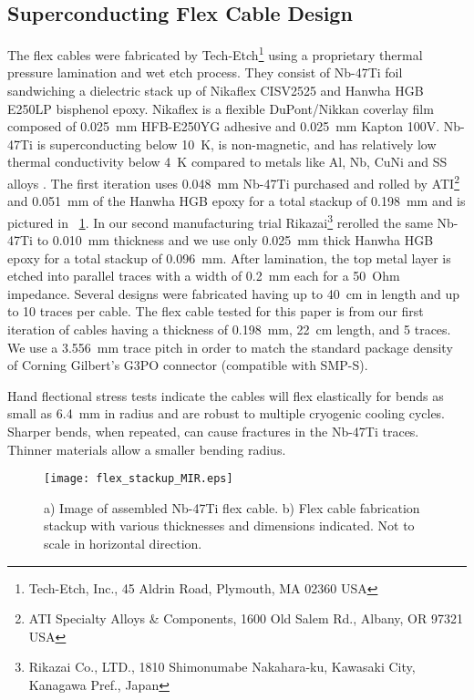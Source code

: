 \subsection{Superconducting Flex Cable Design}
\label{sec:flexcable}
The flex cables were fabricated by Tech-Etch\footnote{Tech-Etch, Inc., 45 Aldrin Road, Plymouth, MA 02360 USA} using a proprietary thermal pressure lamination and wet etch process. They consist of Nb-47Ti foil sandwiching a dielectric stack up of Nikaflex CISV2525 and Hanwha HGB E250LP bisphenol epoxy. Nikaflex is a flexible DuPont/Nikkan coverlay film composed of 0.025~mm HFB-E250YG adhesive and 0.025~mm Kapton 100V. Nb-47Ti is superconducting below 10~K, is non-magnetic, and has relatively low thermal conductivity below 4~K compared to metals like Al, Nb, CuNi and SS alloys \parencite{DaalInPrep}. The first iteration uses 0.048~mm Nb-47Ti purchased and rolled by ATI\footnote{ATI Specialty Alloys \& Components, 1600 Old Salem Rd., Albany, OR 97321 USA} and 0.051~mm of the Hanwha HGB epoxy for a total stackup of 0.198~mm and is pictured in \figurename~\ref{fig:FlexCable}. In our second manufacturing trial Rikazai\footnote{Rikazai Co., LTD., 1810 Shimonumabe Nakahara-ku, Kawasaki City, Kanagawa Pref., Japan} rerolled the same Nb-47Ti to 0.010~mm thickness and we use only 0.025~mm thick Hanwha HGB epoxy for a total stackup of 0.096~mm. After lamination, the top metal layer is etched into parallel traces with a width of 0.2~mm each for a 50~Ohm impedance. Several designs were fabricated having up to 40~cm in length and up to 10 traces per cable. The flex cable tested for this paper is from our first iteration of cables having a thickness of 0.198~mm, 22~cm length, and 5 traces. We use a 3.556~mm trace pitch in order to match the standard package density of Corning Gilbert's G3PO connector (compatible with SMP-S).

Hand flectional stress tests indicate the cables will flex elastically for bends as small as 6.4~mm in radius and are robust to multiple cryogenic cooling cycles. Sharper bends, when repeated, can cause fractures in the Nb-47Ti traces. Thinner materials allow a smaller bending radius.

\begin{figure}[!t]
  \centering
	\texttt{[image: flex\_stackup\_MIR.eps]}
  \caption[Flex cable design]{a) Image of assembled Nb-47Ti flex cable. b) Flex cable fabrication stackup with various thicknesses and dimensions indicated. Not to scale in horizontal direction.}
  \label{fig:FlexCable}
\end{figure}

